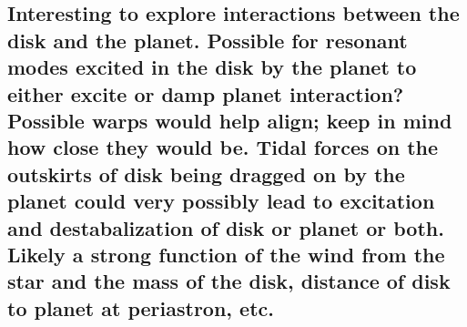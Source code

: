 \subsection{Interesting to explore interactions between the disk and
the planet.  Possible for resonant modes excited in the disk by the
planet to either excite or damp planet interaction? Possible warps
would help align; keep in mind how close they would be.  Tidal
forces on the outskirts of disk being dragged on by the planet could
very possibly lead to excitation and destabalization of disk or
planet or both.  Likely a strong function of the wind from the star
and the mass of the disk, distance of disk to planet at periastron,
etc.}
